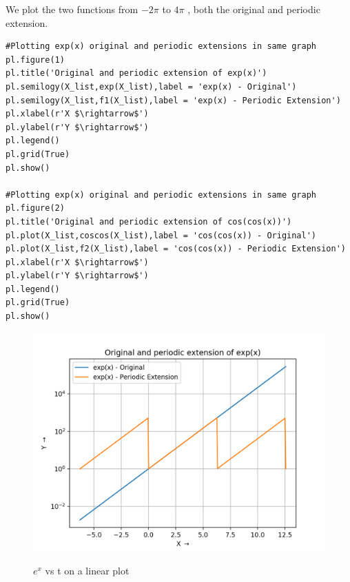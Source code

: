 \documentclass[11pt, a4paper]{article}
\begin{document}
We plot the two functions from $-2\pi$ to $4\pi$ , both the original and periodic extension.
\begin{verbatim}
#Plotting exp(x) original and periodic extensions in same graph
pl.figure(1)
pl.title('Original and periodic extension of exp(x)')
pl.semilogy(X_list,exp(X_list),label = 'exp(x) - Original')
pl.semilogy(X_list,f1(X_list),label = 'exp(x) - Periodic Extension')
pl.xlabel(r'X $\rightarrow$')
pl.ylabel(r'Y $\rightarrow$')
pl.legend()
pl.grid(True)
pl.show()

#Plotting exp(x) original and periodic extensions in same graph
pl.figure(2)
pl.title('Original and periodic extension of cos(cos(x))')
pl.plot(X_list,coscos(X_list),label = 'cos(cos(x)) - Original')
pl.plot(X_list,f2(X_list),label = 'cos(cos(x)) - Periodic Extension')
pl.xlabel(r'X $\rightarrow$')
pl.ylabel(r'Y $\rightarrow$')
pl.legend()
pl.grid(True)
pl.show()
\end{verbatim}

\begin{figure}[H]
   	\centering
   	\includegraphics[scale=0.5]{exp.png}
   	\label{fig:exp}
   	\caption{$e^{x}$ vs t on a linear plot}
\end{figure}
\end{document}
